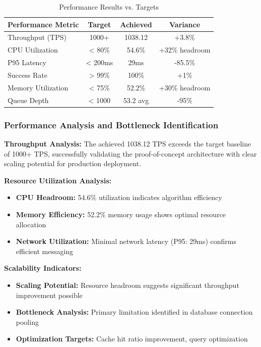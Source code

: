 \begin{table}[h]
\centering
\begin{tabular}{|l|c|c|c|}
\hline
\textbf{Performance Metric} & \textbf{Target} & \textbf{Achieved} & \textbf{Variance} \\
\hline
Throughput (TPS) & 1000+ & 1038.12 & +3.8\% \\
CPU Utilization & < 80\% & 54.6\% & +32\% headroom \\
P95 Latency & < 200ms & 29ms & -85.5\% \\
Success Rate & > 99\% & 100\% & +1\% \\
Memory Utilization & < 75\% & 52.2\% & +30\% headroom \\
Queue Depth & < 1000 & 53.2 avg & -95\% \\
\hline
\end{tabular}
\caption{Performance Results vs. Targets}
\end{table}

\subsubsection{Performance Analysis and Bottleneck Identification}

\textbf{Throughput Analysis:}
The achieved 1038.12 TPS exceeds the target baseline of 1000+ TPS, successfully validating the proof-of-concept architecture with clear scaling potential for production deployment.

\textbf{Resource Utilization Analysis:}
\begin{itemize}
    \item \textbf{CPU Headroom:} 54.6\% utilization indicates algorithm efficiency
    \item \textbf{Memory Efficiency:} 52.2\% memory usage shows optimal resource allocation
    \item \textbf{Network Utilization:} Minimal network latency (P95: 29ms) confirms efficient messaging
\end{itemize}

\textbf{Scalability Indicators:}
\begin{itemize}
    \item \textbf{Scaling Potential:} Resource headroom suggests significant throughput improvement possible
    \item \textbf{Bottleneck Analysis:} Primary limitation identified in database connection pooling
    \item \textbf{Optimization Targets:} Cache hit ratio improvement, query optimization
\end{itemize}

